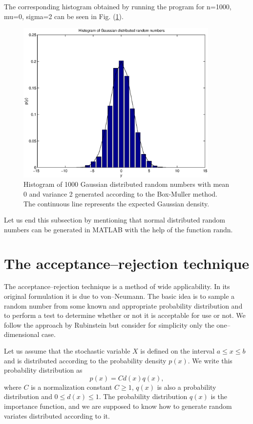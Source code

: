The corresponding histogram obtained by running the program for
n=1000, mu=0, sigma=2 can be seen in Fig. (\ref{F_GAUSSDISTR}).
\begin{figure}
\label{F_GAUSSDISTR}
\includegraphics[width=10cm]{./Figures/f_gaussdistr.eps}
\caption{Histogram of 1000 Gaussian distributed random numbers with
mean 0 and variance 2 generated according to the Box-Muller method. 
The continuous line represents the expected Gaussian density.}
\end{figure}

Let us end this subsection by mentioning that normal distributed
random numbers can be generated in MATLAB with the help of 
the function {\sf randn}.

\section{The acceptance--rejection technique}
The acceptance--rejection technique is a method of wide 
applicability. In its original formulation it is due to 
von--Neumann. The basic idea is to sample a random number
from some known and appropriate probability distribution and to 
perform a test to determine whether or not it is acceptable for 
use or not. We follow the approach by Rubinstein 
\cite{RUBINSTEIN} but consider for simplicity only
the one--dimensional case.

Let us assume that the stochastic variable $X$ is defined on the 
interval $a \le x \le b$ and is distributed according to the
probability density $p(x)$. We write this probability distribution 
as
\begin{equation*}
p(x) = C d(x) q(x),
\end{equation*}
where $C$ is a normalization constant $C \ge 1$, $q(x)$ is also a 
probability distribution and $0 \le d(x) \le 1$. The probability 
distribution $q(x)$ is the importance function, and  we are 
supposed to know how to generate random variates distributed 
according to it.

